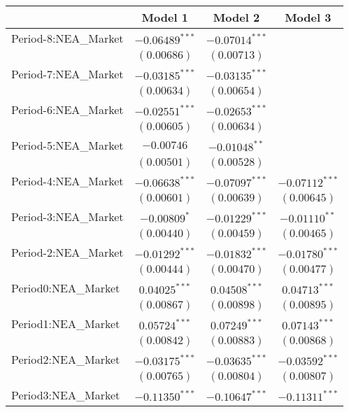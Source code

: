 
\begin{tabular}{l c c c}
\hline
 & Model 1 & Model 2 & Model 3 \\
\hline
Period-8:NEA\_Market & $-0.06489^{***}$ & $-0.07014^{***}$ &                  \\
                     & $(0.00686)$      & $(0.00713)$      &                  \\
Period-7:NEA\_Market & $-0.03185^{***}$ & $-0.03135^{***}$ &                  \\
                     & $(0.00634)$      & $(0.00654)$      &                  \\
Period-6:NEA\_Market & $-0.02551^{***}$ & $-0.02653^{***}$ &                  \\
                     & $(0.00605)$      & $(0.00634)$      &                  \\
Period-5:NEA\_Market & $-0.00746$       & $-0.01048^{**}$  &                  \\
                     & $(0.00501)$      & $(0.00528)$      &                  \\
Period-4:NEA\_Market & $-0.06638^{***}$ & $-0.07097^{***}$ & $-0.07112^{***}$ \\
                     & $(0.00601)$      & $(0.00639)$      & $(0.00645)$      \\
Period-3:NEA\_Market & $-0.00809^{*}$   & $-0.01229^{***}$ & $-0.01110^{**}$  \\
                     & $(0.00440)$      & $(0.00459)$      & $(0.00465)$      \\
Period-2:NEA\_Market & $-0.01292^{***}$ & $-0.01832^{***}$ & $-0.01780^{***}$ \\
                     & $(0.00444)$      & $(0.00470)$      & $(0.00477)$      \\
Period0:NEA\_Market  & $0.04025^{***}$  & $0.04508^{***}$  & $0.04713^{***}$  \\
                     & $(0.00867)$      & $(0.00898)$      & $(0.00895)$      \\
Period1:NEA\_Market  & $0.05724^{***}$  & $0.07249^{***}$  & $0.07143^{***}$  \\
                     & $(0.00842)$      & $(0.00883)$      & $(0.00868)$      \\
Period2:NEA\_Market  & $-0.03175^{***}$ & $-0.03635^{***}$ & $-0.03592^{***}$ \\
                     & $(0.00765)$      & $(0.00804)$      & $(0.00807)$      \\
Period3:NEA\_Market  & $-0.11350^{***}$ & $-0.10647^{***}$ & $-0.11311^{***}$ \\

\end{tabular}
